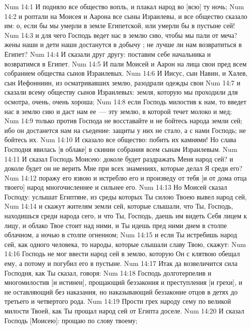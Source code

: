 \vs Num 14:1 И подняло все общество вопль, и плакал народ во [всю] ту ночь;
\vs Num 14:2 и роптали на Моисея и Аарона все сыны Израилевы, и все общество сказало им: о, если бы мы умерли в земле Египетской, или умерли бы в пустыне сей!
\vs Num 14:3 и для чего Господь ведет нас в землю сию, чтобы мы пали от меча? жены наши и дети наши достанутся в добычу ; не лучше ли нам возвратиться в Египет?
\vs Num 14:4 И сказали друг другу: поставим себе начальника и возвратимся в Египет.
\vs Num 14:5 И пали Моисей и Аарон на лица свои пред всем собранием общества сынов Израилевых.
\vs Num 14:6 И Иисус, сын Навин, и Халев, сын Иефонниин, из осматривавших землю, разодрали одежды свои
\vs Num 14:7 и сказали всему обществу сынов Израилевых: земля, которую мы проходили для осмотра, очень, очень хороша;
\vs Num 14:8 если Господь милостив к нам, то введет нас в землю сию и даст нам ее~--- эту землю, в которой течет молоко и мед;
\vs Num 14:9 только против Господа не восставайте и не бойтесь народа земли сей; ибо он достанется нам на съедение: защиты у них не стало, а с нами Господь; не бойтесь их.
\vs Num 14:10 И сказало все общество: побить их камнями! Но слава Господня явилась [в облаке] в скинии собрания всем сынам Израилевым.
\rsbpar\vs Num 14:11 И сказал Господь Моисею: доколе будет раздражать Меня народ сей? и доколе будет он не верить Мне при всех знамениях, которые делал Я среди его?
\vs Num 14:12 поражу его язвою и истреблю его и произведу от тебя [и от дома отца твоего] народ многочисленнее и сильнее его.
\vs Num 14:13 Но Моисей сказал Господу: услышат Египтяне, из среды которых Ты силою Твоею вывел народ сей,
\vs Num 14:14 и скажут жителям земли сей, которые слышали, что Ты, Господь, находишься среди народа сего, и что Ты, Господь, даешь им видеть Себя лицем к лицу, и облако Твое стоит над ними, и Ты идешь пред ними днем в столпе облачном, а ночью в столпе огненном;
\vs Num 14:15 и если Ты истребишь народ сей, как одного человека, то народы, которые слышали славу Твою, скажут:
\vs Num 14:16 Господь не мог ввести народ сей в землю, которую Он с клятвою обещал ему, а потому и погубил его в пустыне.
\vs Num 14:17 Итак да возвеличится сила Господня, как Ты сказал, говоря:
\vs Num 14:18 Господь долготерпелив и многомилостив [и истинен], прощающий беззакония и преступления [и грехи], и не оставляющий без наказания, но наказывающий беззаконие отцов в детях до третьего и четвертого рода.
\vs Num 14:19 Прости грех народу сему по великой милости Твоей, как Ты прощал народ сей от Египта доселе.
\rsbpar\vs Num 14:20 И сказал Господь [Моисею]: прощаю по слову твоему;
